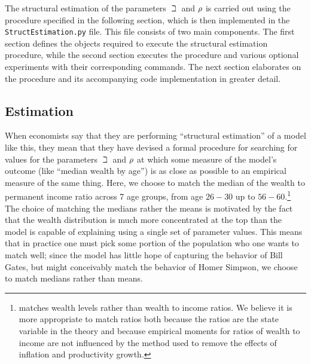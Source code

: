 The structural estimation of the parameters $\beth$ and $\rho$ is carried out using
the procedure specified in the following section, which is then implemented in
the \texttt{StructEstimation.py} file. This file consists of two main components. The
first section defines the objects required to execute the structural estimation procedure,
while the second section executes the procedure and various optional
experiments with their corresponding commands. The next section elaborates on the procedure
and its accompanying code implementation in greater detail.

\hypertarget{estimation}{}
\subsection{Estimation}

When economists say that they are performing ``structural estimation''
of a model like this, they mean that they have devised a
formal procedure for searching for values for the parameters $\beth$
and $\rho$ at which some measure of the model's outcome (like
``median wealth by age'') is as close as possible to an empirical measure
of the same thing. Here, we choose to match the median of the
wealth to permanent income ratio across 7 age groups, from age $26-30$
up to $56-60$.\footnote{\cite{cagettiWprofiles}
  matches wealth levels rather than wealth to income ratios. We
  believe it is more appropriate to match ratios both because the
  ratios are the state variable in the theory and because empirical
  moments for ratios of wealth to income are not influenced by the
  method used to remove the effects of inflation and productivity
  growth.} The choice of matching the medians rather the means is
motivated by the fact that the wealth distribution is much more
concentrated at the top than the model is capable of explaining using a single
set of parameter values.  This means that in practice one must pick
some portion of the population who one wants to match well; since the
model has little hope of capturing the behavior of Bill Gates, but
might conceivably match the behavior of Homer Simpson, we choose to
match medians rather than means.

